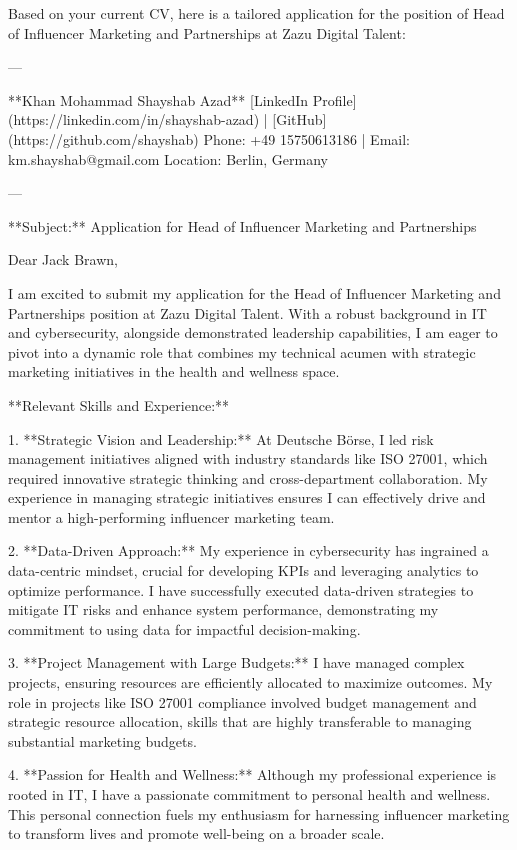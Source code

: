 Based on your current CV, here is a tailored application for the position of Head of Influencer Marketing and Partnerships at Zazu Digital Talent:

---

**Khan Mohammad Shayshab Azad**  
[LinkedIn Profile](https://linkedin.com/in/shayshab-azad) | [GitHub](https://github.com/shayshab)  
Phone: +49 15750613186 | Email: km.shayshab@gmail.com  
Location: Berlin, Germany

---

**Subject:** Application for Head of Influencer Marketing and Partnerships

Dear Jack Brawn,

I am excited to submit my application for the Head of Influencer Marketing and Partnerships position at Zazu Digital Talent. With a robust background in IT and cybersecurity, alongside demonstrated leadership capabilities, I am eager to pivot into a dynamic role that combines my technical acumen with strategic marketing initiatives in the health and wellness space.

**Relevant Skills and Experience:**

1. **Strategic Vision and Leadership:** At Deutsche Börse, I led risk management initiatives aligned with industry standards like ISO 27001, which required innovative strategic thinking and cross-department collaboration. My experience in managing strategic initiatives ensures I can effectively drive and mentor a high-performing influencer marketing team.

2. **Data-Driven Approach:** My experience in cybersecurity has ingrained a data-centric mindset, crucial for developing KPIs and leveraging analytics to optimize performance. I have successfully executed data-driven strategies to mitigate IT risks and enhance system performance, demonstrating my commitment to using data for impactful decision-making.

3. **Project Management with Large Budgets:** I have managed complex projects, ensuring resources are efficiently allocated to maximize outcomes. My role in projects like ISO 27001 compliance involved budget management and strategic resource allocation, skills that are highly transferable to managing substantial marketing budgets.

4. **Passion for Health and Wellness:** Although my professional experience is rooted in IT, I have a passionate commitment to personal health and wellness. This personal connection fuels my enthusiasm for harnessing influencer marketing to transform lives and promote well-being on a broader scale.

